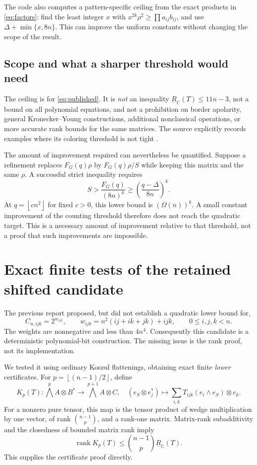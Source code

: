\documentclass[11pt]{article}
\theoremstyle{definition}
\theoremstyle{remark}
\newcommand{\C}{\mathbb C}
\newcommand{\BR}{\underline R_{\C}}
\newcommand{\rank}{\operatorname{rank}}
\newcommand{\floor}[1]{\left\lfloor #1\right\rfloor}
\begin{document}
The code also computes a pattern-specific ceiling from the exact products in \eqref{eq:factors}: find the least integer $x$ with $x^{2k}\rho^2\ge\prod a_{ij}b_{ij}$, and use $\Delta+\min\{x,8n\}$. This can improve the uniform constants without changing the scope of the result.

\subsection{Scope and what a sharper threshold would need}

The ceiling is for \eqref{eq:published}. It is \emph{not} an inequality $\BR(T)\le11n-3$, not a bound on all polynomial equations, and not a prohibition on border apolarity, general Kronecker--Young constructions, additional nonclassical operations, or more accurate rank bounds for the same matrices. The source explicitly records examples where its coloring threshold is not tight \cite[Examples 3.6--3.7]{dm}.

The amount of improvement required can nevertheless be quantified. Suppose a refinement replaces $F_G(q)\rho$ by $F_G(q)\rho/S$ while keeping this matrix and the same $\rho$. A successful strict inequality requires
\[
 S>\frac{F_G(q)}{(8n)^k}
 \ge\left(\frac{q-\Delta}{8n}\right)^k.
\]
At $q=\floor{cn^2}$ for fixed $c>0$, this lower bound is $(\Omega(n))^k$. A small constant improvement of the counting threshold therefore does not reach the quadratic target. This is a necessary amount of improvement relative to that threshold, not a proof that such improvements are impossible.

\section{Exact finite tests of the retained shifted candidate}\label{sec:finite}

The previous report proposed, but did not establish a quadratic lower bound for,
\begin{equation}\label{eq:shifted}
 C_{n,ijk}=2^{w_{ijk}},\qquad
 w_{ijk}=n^2(ij+ik+jk)+ijk,\qquad0\le i,j,k<n.
\end{equation}
The weights are nonnegative and less than $4n^4$. Consequently this candidate is a deterministic polynomial-bit construction. The missing issue is the rank proof, not its implementation.

We tested it using ordinary Koszul flattenings, obtaining exact finite \emph{lower} certificates. For $p=\floor{(n-1)/2}$, define
\[
 K_p(T):\bigwedge^p A\otimes B^*\longrightarrow\bigwedge^{p+1}A\otimes C,
 \quad
 (e_S\otimes e_j^*)\longmapsto
 \sum_{i,k}T_{ijk}(e_i\wedge e_S)\otimes e_k.
\]
For a nonzero pure tensor, this map is the tensor product of wedge multiplication by one vector, of rank $\binom{n-1}p$, and a rank-one matrix. Matrix-rank subadditivity and the closedness of bounded matrix rank imply
\begin{equation}\label{eq:ordinarykoszul}
 \rank K_p(T)\le\binom{n-1}p\BR(T).
\end{equation}
This supplies the certificate proof directly.
\end{document}
